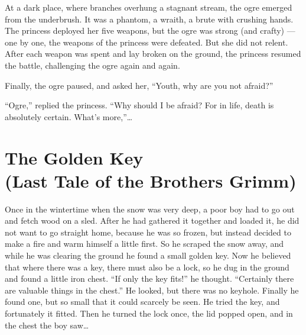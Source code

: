 \documentclass[letterpaper,oneside]{memoir}
\begin{document}
\begin{description}
At a dark place, where branches overhung a stagnant stream, the ogre emerged from the underbrush. It was a phantom, a wraith, a brute with crushing hands. The princess deployed her five weapons, but the ogre was strong (and crafty) --- one by one, the weapons of the princess were defeated. But she did not relent. After each weapon was spent and lay broken on the ground, the princess resumed the battle, challenging the ogre again and again.
 
Finally, the ogre paused, and asked her, ``Youth, why are you not afraid?''

``Ogre,'' replied the princess. ``Why should I be afraid? For in life, death is absolutely certain. What's more,''\ldots
\newpage
\section{The Golden Key 
\\(Last Tale of the Brothers Grimm)}
Once in the wintertime when the snow was very deep, a poor boy had to go out and fetch wood on a sled. After he had gathered it together and loaded it, he did not want to go straight home, because he was so frozen, but instead decided to make a fire and warm himself a little first. So he scraped the snow away, and while he was clearing the ground he found a small golden key. Now he believed that where there was a key, there must also be a lock, so he dug in the ground and found a little iron chest. ``If only the key fits!'' he thought. ``Certainly there are valuable things in the chest.'' He looked, but there was no keyhole. Finally he found one, but so small that it could scarcely be seen. He tried the key, and fortunately it fitted. Then he turned the lock once, the lid popped open, and in the chest the boy saw\ldots
\newpage

\end{description}
\end{document}
